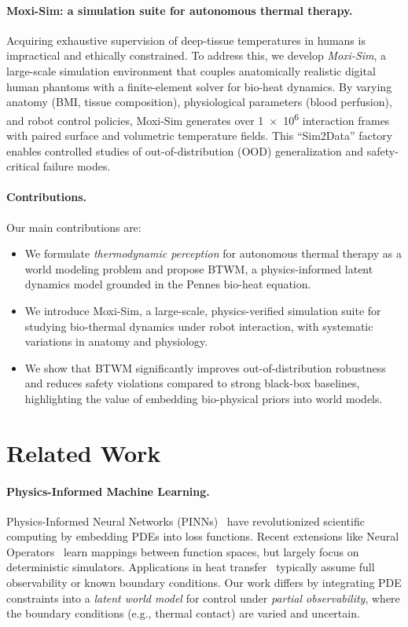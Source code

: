 \documentclass{article}
\begin{document}
\paragraph{Moxi-Sim: a simulation suite for autonomous thermal therapy.}
Acquiring exhaustive supervision of deep-tissue temperatures in humans is impractical and ethically constrained. To address this, we develop \emph{Moxi-Sim}, a large-scale simulation environment that couples anatomically realistic digital human phantoms with a finite-element solver for bio-heat dynamics. By varying anatomy (BMI, tissue composition), physiological parameters (blood perfusion), and robot control policies, Moxi-Sim generates over \num{1e6} interaction frames with paired surface and volumetric temperature fields. This ``Sim2Data'' factory enables controlled studies of out-of-distribution (OOD) generalization and safety-critical failure modes.

\paragraph{Contributions.}
Our main contributions are:
\begin{itemize}
    \item We formulate \emph{thermodynamic perception} for autonomous thermal therapy as a world modeling problem and propose BTWM, a physics-informed latent dynamics model grounded in the Pennes bio-heat equation.
    \item We introduce Moxi-Sim, a large-scale, physics-verified simulation suite for studying bio-thermal dynamics under robot interaction, with systematic variations in anatomy and physiology.
    \item We show that BTWM significantly improves out-of-distribution robustness and reduces safety violations compared to strong black-box baselines, highlighting the value of embedding bio-physical priors into world models.
\end{itemize}

\section{Related Work}
\label{sec:related}

\paragraph{Physics-Informed Machine Learning.}
Physics-Informed Neural Networks (PINNs)~\cite{raissi2019physics,karniadakis2021physics} have revolutionized scientific computing by embedding PDEs into loss functions. Recent extensions like Neural Operators~\cite{li2024fourier,chen2023crom} learn mappings between function spaces, but largely focus on deterministic simulators. Applications in heat transfer~\cite{wang2024expert,fan2024thermal} typically assume full observability or known boundary conditions. Our work differs by integrating PDE constraints into a \emph{latent world model} for control under \emph{partial observability}, where the boundary conditions (e.g., thermal contact) are varied and uncertain.
\end{document}
